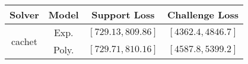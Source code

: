 \begin{tabular}{cc|c|c} 
\hline 
 Solver & Model & Support Loss  & Challenge Loss \tabularnewline\hline 
\hline 
\multirow{2}{*}{cachet} & Exp. & $\left[729.13,809.86\right]$ & $\left[4362.4,4846.7\right]$ \tabularnewline 
 & Poly. & $\left[729.71,810.16\right]$ & $\left[4587.8,5399.2\right]$ \tabularnewline 
\hline 
\end{tabular} 

